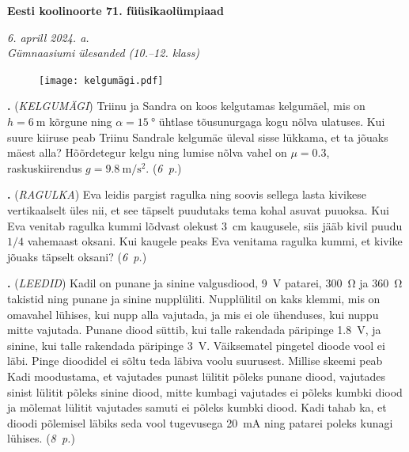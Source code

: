 \documentclass[11pt,a5paper]{article}
\newcommand{\numb}[1]{\vspace{5pt}\textbf{\large #1}}
\newcommand{\nimi}[1]{(\textsl{\small \uppercase{#1}})}
\newcommand{\punktid}[1]{(\emph{#1~p.})}
\newcounter{ylesanne}
\newcommand{\yl}[1]{\addtocounter{ylesanne}{1}\numb{\theylesanne.} \nimi{#1} \newblock{}}
\newcommand{\autor}[1]{}%
\begin{document}
\begin{center}
  \textbf{\Large Eesti koolinoorte 71. füüsikaolümpiaad} \par
  \emph{6. aprill 2024. a.\\Gümnaasiumi ülesanded (10.--12. klass)}
\end{center}

 \par

\begin{figure}
  \vspace*{-5mm}
    \texttt{[image: kelgumägi.pdf]}
\end{figure}
\yl{Kelgumägi}
Triinu ja Sandra on koos kelgutamas kelgumäel, mis on $h=\SI{6}{\m}$ kõrgune ning $\alpha=\SI{15}{\degree}$ ühtlase tõusunurgaga kogu nõlva ulatuses. Kui suure kiiruse peab Triinu Sandrale kelgumäe üleval sisse lükkama, et ta jõuaks mäest alla? Hõõrdetegur kelgu ning lumise nõlva vahel on $\mu=\num{0.3}$, raskuskiirendus $g=\SI{9.8}{\m\per\s\squared}$.
\punktid{6} \autor{Hans Daniel Kaimre}

\yl{Ragulka}
Eva leidis pargist ragulka ning soovis sellega lasta kivikese vertikaalselt üles nii, et see täpselt puudutaks tema kohal asuvat puuoksa. Kui Eva venitab ragulka kummi lõdvast olekust \SI{3}{\cm} kaugusele, siis jääb kivil puudu $1/4$ vahemaast oksani. Kui kaugele peaks Eva venitama ragulka kummi, et kivike jõuaks täpselt oksani?
\punktid{6} \autor{Taavi Pungas}

\yl{Leedid}
Kadil on punane ja sinine valgusdiood, \SI{9}{\V} patarei, \SI{300}{\ohm} ja \SI{360}{\ohm} takistid ning punane ja sinine nupplüliti. Nupplülitil on kaks klemmi, mis on omavahel lühises, kui nupp alla vajutada, ja mis ei ole ühenduses, kui nuppu mitte vajutada. Punane diood süttib, kui talle rakendada päripinge \SI{1.8}{\V}, ja sinine, kui talle rakendada päripinge \SI{3}{\V}. Väiksematel pingetel dioode vool ei läbi. Pinge dioodidel ei sõltu teda läbiva voolu suurusest. Millise skeemi peab Kadi moodustama, et vajutades punast lülitit põleks punane diood, vajutades sinist lülitit põleks sinine diood, mitte kumbagi vajutades ei põleks kumbki diood ja mõlemat lülitit vajutades samuti ei põleks kumbki diood. Kadi tahab ka, et dioodi põlemisel läbiks seda vool tugevusega \SI{20}{\mA} ning patarei poleks kunagi lühises.
\punktid{8} \autor{Sandra Schumann}
\end{document}
